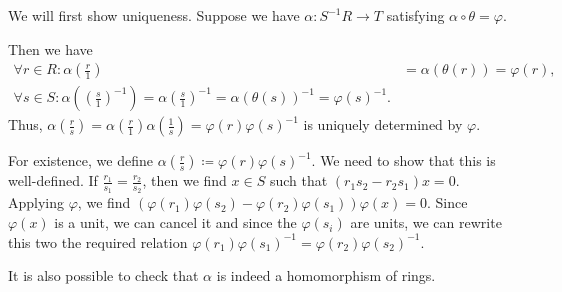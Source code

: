 We will first show uniqueness. Suppose we have $\alpha\colon S^{-1}R\to T$ satisfying
$\alpha \circ \theta = \varphi$.

Then we have
\begin{align*}
	\forall r \in R\colon \alpha(\frac{r}{1}) &= \alpha(\theta(r)) = \varphi(r),\\
	\forall s \in S\colon \alpha((\frac{s}{1})^{-1})=\alpha(\frac{s}{1})^{-1} = \alpha(\theta(s))^{-1} = \varphi(s)^{-1}.
\end{align*}
Thus, $\alpha(\frac{r}{s}) = \alpha(\frac{r}{1})\alpha(\frac{1}{s}) = \varphi(r)\varphi(s)^{-1}$ is
uniquely determined by $\varphi$.

For existence, we define $\alpha(\frac{r}{s})\coloneqq \varphi(r)\varphi(s)^{-1}$.
We need to show that this is well-defined. If $\frac{r_1}{s_1}=\frac{r_2}{s_2}$,
then we find $x \in S$ such that $(r_1s_2 - r_2s_1)x = 0$. Applying $\varphi$,
we find $(\varphi(r_1)\varphi(s_2) - \varphi(r_2)\varphi(s_1))\varphi(x) = 0$.
Since $\varphi(x)$ is a unit, we can cancel it and since the $\varphi(s_i)$ are
units, we can rewrite this two the required relation
$\varphi(r_1)\varphi(s_1)^{-1} = \varphi(r_2)\varphi(s_2)^{-1}$.

It is also possible to check that $\alpha$ is indeed a homomorphism of rings.
